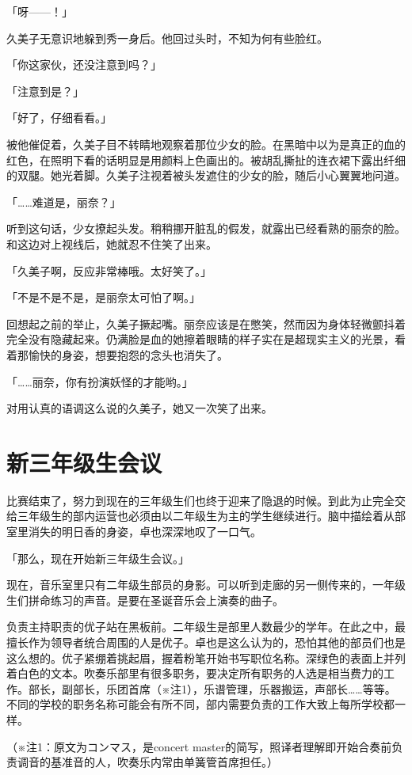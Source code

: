 \documentclass[UTF8]{ctexart}
\begin{document}
    「呀——！」

    久美子无意识地躲到秀一身后。他回过头时，不知为何有些脸红。

    「你这家伙，还没注意到吗？」

    「注意到是？」

    「好了，仔细看看。」

    被他催促着，久美子目不转睛地观察着那位少女的脸。在黑暗中以为是真正的血的红色，在照明下看的话明显是用颜料上色画出的。被胡乱撕扯的连衣裙下露出纤细的双腿。她光着脚。久美子注视着被头发遮住的少女的脸，随后小心翼翼地问道。

    「……难道是，丽奈？」

    听到这句话，少女撩起头发。稍稍挪开脏乱的假发，就露出已经看熟的丽奈的脸。和这边对上视线后，她就忍不住笑了出来。

    「久美子啊，反应非常棒哦。太好笑了。」

    「不是不是不是，是丽奈太可怕了啊。」

    回想起之前的举止，久美子撅起嘴。丽奈应该是在憋笑，然而因为身体轻微颤抖着完全没有隐藏起来。仍满脸是血的她擦着眼睛的样子实在是超现实主义的光景，看着那愉快的身姿，想要抱怨的念头也消失了。

    「……丽奈，你有扮演妖怪的才能哟。」

    对用认真的语调这么说的久美子，她又一次笑了出来。
    \section{新三年级生会议}
    比赛结束了，努力到现在的三年级生们也终于迎来了隐退的时候。到此为止完全交给三年级生的部内运营也必须由以二年级生为主的学生继续进行。脑中描绘着从部室里消失的明日香的身姿，卓也深深地叹了一口气。

    「那么，现在开始新三年级生会议。」

    现在，音乐室里只有二年级生部员的身影。可以听到走廊的另一侧传来的，一年级生们拼命练习的声音。是要在圣诞音乐会上演奏的曲子。

    负责主持职责的优子站在黑板前。二年级生是部里人数最少的学年。在此之中，最擅长作为领导者统合周围的人是优子。卓也是这么认为的，恐怕其他的部员们也是这么想的。优子紧绷着挑起眉，握着粉笔开始书写职位名称。深绿色的表面上并列着白色的文本。吹奏乐部里有很多职务，要决定所有职务的人选是相当费力的工作。部长，副部长，乐团首席（※注1），乐谱管理，乐器搬运，声部长……等等。不同的学校的职务名称可能会有所不同，部内需要负责的工作大致上每所学校都一样。

    （※注1：原文为コンマス，是concert master的简写，照译者理解即开始合奏前负责调音的基准音的人，吹奏乐内常由单簧管首席担任。）
\end{document}
